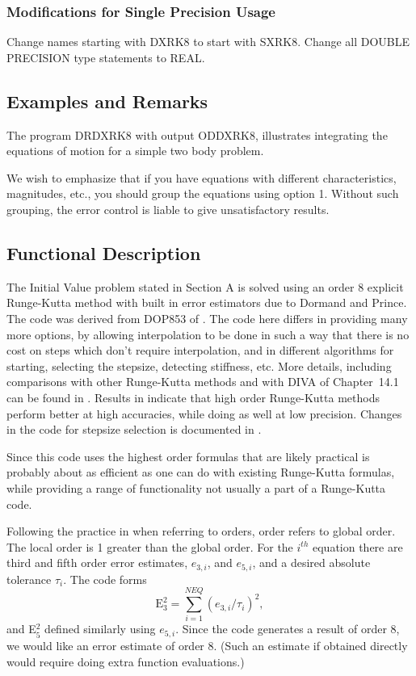 \documentclass[twoside]{MATH77}
\begin{document}
\subsubsection{Modifications for Single Precision Usage\label{Sngl}}

Change names starting with DXRK8 to start with SXRK8.  Change all DOUBLE
PRECISION type statements to REAL.

\subsection{Examples and Remarks}

The program DRDXRK8 with output ODDXRK8, illustrates integrating the
equations of motion for a simple two body problem.

We wish to emphasize that if you have equations with different
characteristics, magnitudes, etc., you should group the equations using
option 1.  Without such grouping, the error control is liable to give
unsatisfactory results.

\subsection{Functional Description}

The Initial Value problem stated in Section A is solved using an order
8 explicit Runge-Kutta method with built in error estimators due to
Dormand and Prince.  The code was derived from DOP853 of
\cite{Hairer:1993:SOD}.  The code here differs in providing many more
options, by allowing interpolation to be done in such a way that there
is no cost on steps which don't require interpolation, and in
different algorithms for starting, selecting the stepsize, detecting
stiffness, etc.  More details, including comparisons with other
Runge-Kutta methods and with DIVA of Chapter~14.1 can be found in
\cite{Krogh:1997:AAG}.  Results in \cite{Krogh:1997:AAG} indicate that
high order Runge-Kutta methods perform better at high accuracies,
while doing as well at low precision.  Changes in the code for
stepsize selection is documented in \cite{Krogh:2009:SSO}.

Since this code uses the highest order formulas that are likely
practical is probably about as efficient as one can do with existing
Runge-Kutta formulas, while providing a range of functionality not
usually a part of a Runge-Kutta code.

Following the practice in \cite{Hairer:1993:SOD} when referring to orders,
order refers to global order.  The local order is 1 greater than the
global order.  For the $i^{th}$ equation there are third and fifth order
error estimates, $e_{3,i}$, and $e_{5,i}$, and a desired absolute tolerance
$\tau_i$.  The code forms
\begin{equation}
 \text{E}_3^2 = \sum_{i=1}^{NEQ} (e_{3,i} / \tau_i)^2,
\end{equation}
and E$_5^2$ defined similarly using $e_{5,i}$.  Since the code generates
a result of order 8, we would like an error estimate of order 8.  (Such an
estimate if obtained directly would require doing extra function
evaluations.)
\end{document}
